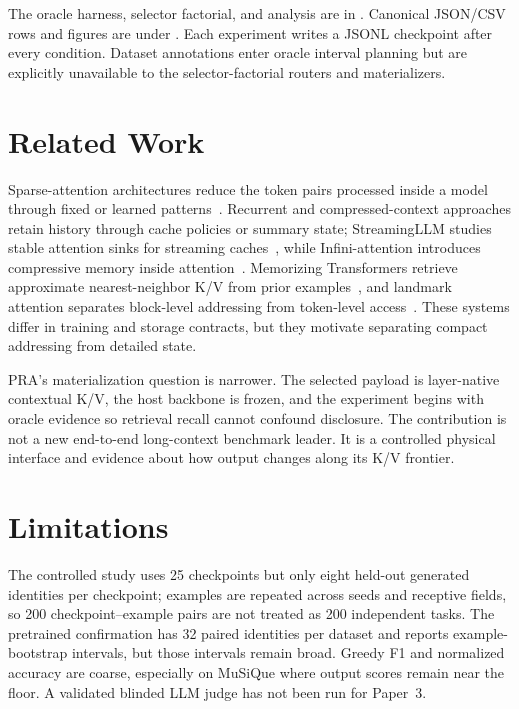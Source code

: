 \documentclass[11pt]{article}
\begin{document}
The oracle harness, selector factorial, and analysis are in
.  Canonical JSON/CSV rows and figures are under
.  Each experiment writes a JSONL
checkpoint after every condition.  Dataset annotations enter oracle interval planning but are
explicitly unavailable to the selector-factorial routers and materializers.

\section{Related Work}

Sparse-attention architectures reduce the token pairs processed inside a model through fixed or
learned patterns~\cite{beltagy2020longformer}.  Recurrent and compressed-context approaches retain
history through cache policies or summary state; StreamingLLM studies stable attention sinks for
streaming caches~\cite{xiao2023streamingllm}, while Infini-attention introduces compressive memory
inside attention~\cite{munkhdalai2024infini}.  Memorizing Transformers retrieve approximate
nearest-neighbor K/V from prior examples~\cite{wu2022memorizing}, and landmark attention separates
block-level addressing from token-level access~\cite{mohtashami2023landmark}.  These systems differ
in training and storage contracts, but they motivate separating compact addressing from detailed
state.

PRA's materialization question is narrower.  The selected payload is layer-native contextual K/V,
the host backbone is frozen, and the experiment begins with oracle evidence so retrieval recall
cannot confound disclosure.  The contribution is not a new end-to-end long-context benchmark
leader.  It is a controlled physical interface and evidence about how output changes along its
K/V frontier.

\section{Limitations}

The controlled study uses 25 checkpoints but only eight held-out generated identities per
checkpoint; examples are repeated across seeds and receptive fields, so 200 checkpoint--example
pairs are not treated as 200 independent tasks.  The pretrained confirmation has 32 paired
identities per dataset and reports example-bootstrap intervals, but those intervals remain broad.
Greedy F1 and normalized accuracy are coarse, especially on MuSiQue where output scores remain
near the floor.  A validated blinded LLM judge has not been run for Paper~3.
\end{document}

